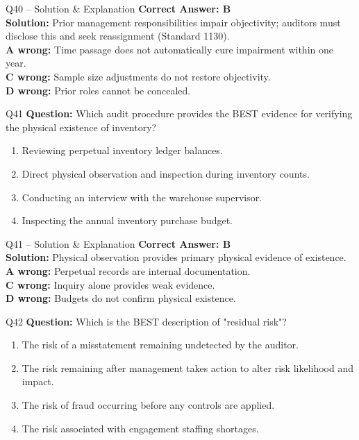 \documentclass[aspectratio=169,10pt]{beamer}
\begin{document}
	\begin{frame}[t]{Q40 -- Solution \& Explanation}
		\small
		\textbf{Correct Answer: B} \\[4pt]
		\textbf{Solution:} Prior management responsibilities impair objectivity; auditors must disclose this and seek reassignment (Standard 1130). \\[4pt]
		\textbf{A wrong:} Time passage does not automatically cure impairment within one year. \\[2pt]
		\textbf{C wrong:} Sample size adjustments do not restore objectivity. \\[2pt]
		\textbf{D wrong:} Prior roles cannot be concealed.
	\end{frame}
	
	\begin{frame}[t]{Q41}
		\small
		\textbf{Question:} Which audit procedure provides the BEST evidence for verifying the physical existence of inventory?
		\begin{enumerate}[label=\Alph*.,itemsep=1pt,topsep=2pt]
			\item Reviewing perpetual inventory ledger balances.
			\item Direct physical observation and inspection during inventory counts.
			\item Conducting an interview with the warehouse supervisor.
			\item Inspecting the annual inventory purchase budget.
		\end{enumerate}
	\end{frame}
	
	\begin{frame}[t]{Q41 -- Solution \& Explanation}
		\small
		\textbf{Correct Answer: B} \\[4pt]
		\textbf{Solution:} Physical observation provides primary physical evidence of existence. \\[4pt]
		\textbf{A wrong:} Perpetual records are internal documentation. \\[2pt]
		\textbf{C wrong:} Inquiry alone provides weak evidence. \\[2pt]
		\textbf{D wrong:} Budgets do not confirm physical existence.
	\end{frame}
	
	\begin{frame}[t]{Q42}
		\small
		\textbf{Question:} Which is the BEST description of "residual risk"?
		\begin{enumerate}[label=\Alph*.,itemsep=1pt,topsep=2pt]
			\item The risk of a misstatement remaining undetected by the auditor.
			\item The risk remaining after management takes action to alter risk likelihood and impact.
			\item The risk of fraud occurring before any controls are applied.
			\item The risk associated with engagement staffing shortages.
		\end{enumerate}
	\end{frame}
	
\end{document}
